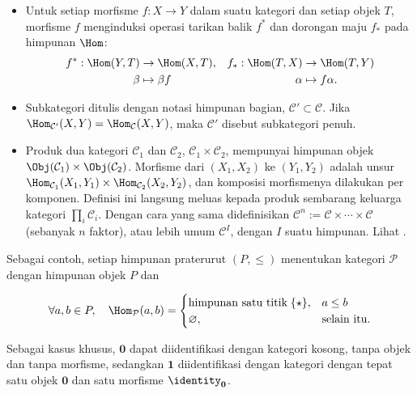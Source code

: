 \begin{itemize}
	\item Untuk setiap morfisme $f: X \to Y$ dalam suatu kategori dan setiap
	objek $T$, morfisme $f$ menginduksi operasi tarikan balik $f^*$ dan dorongan
	maju $f_*$ pada himpunan $\Hom$:
	\begin{align*}
		f^*: \Hom(Y, T) & \to \Hom(X, T), & f_*: \Hom(T, X) & \to \Hom(T, Y) \\
		\beta & \mapsto \beta f & \alpha & \mapsto f\alpha .
	\end{align*}
	\item Subkategori ditulis dengan notasi himpunan bagian,
	$\mathcal{C}' \subset \mathcal{C}$. Jika
	$\Hom_{\mathcal{C}'}(X, Y) = \Hom_{\mathcal{C}}(X, Y)$, maka
	$\mathcal{C}'$ disebut subkategori penuh.

	\item Produk dua kategori $\mathcal{C}_1$ dan $\mathcal{C}_2$,
	$\mathcal{C}_1 \times \mathcal{C}_2$, mempunyai himpunan objek
	$\Obj(\mathcal{C}_1) \times \Obj(\mathcal{C}_2)$. Morfisme dari
	$(X_1, X_2)$ ke $(Y_1, Y_2)$ adalah unsur
	$\Hom_{\mathcal{C}_1}(X_1, Y_1) \times
	\Hom_{\mathcal{C}_2}(X_2, Y_2)$, dan komposisi morfismenya dilakukan per
	komponen. Definisi ini langsung meluas kepada produk sembarang keluarga
	kategori $\prod_i \mathcal{C}_i$. Dengan cara yang sama didefinisikan
	$\mathcal{C}^n := \mathcal{C} \times \cdots \times \mathcal{C}$ (sebanyak
	$n$ faktor), atau lebih umum $\mathcal{C}^I$, dengan $I$ suatu himpunan.
	Lihat \cite[Definisi~2.3.1]{Li1}.
\end{itemize}

Sebagai contoh, setiap himpunan praterurut $(P, \leq)$ menentukan kategori
$\mathcal{P}$ dengan himpunan objek $P$ dan

\[ \forall a,b \in P, \quad \Hom_{\mathcal{P}}(a, b) = \begin{cases}
	\text{himpunan satu titik} \; \{ \star \}, & a \leq b \\
	\emptyset, & \text{selain itu.}
\end{cases}\]

Sebagai kasus khusus, $\mathbf{0}$ dapat diidentifikasi dengan kategori kosong,
tanpa objek dan tanpa morfisme, sedangkan $\mathbf{1}$ diidentifikasi dengan
kategori dengan tepat satu objek $\mathbf{0}$ dan satu morfisme
$\identity_{\mathbf{0}}$.

